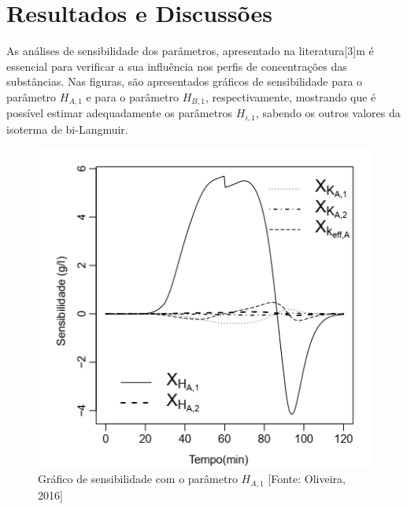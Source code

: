 \documentclass[por]{Template_SBEF}
\begin{document}
\section{Resultados e Discussões}
As análises de sensibilidade dos parâmetros, apresentado na literatura[3]m é essencial para verificar a sua influência nos perfis de concentrações das substâncias. Nas figuras, são apresentados gráficos de sensibilidade para o parâmetro $H_{A,1}$ e para o parâmetro $H_{B,1}$, respectivamente, mostrando que é possível estimar adequadamente os parâmetros $H_{i,1}$, sabendo os outros valores da isoterma de bi-Langmuir.




\begin{figure}[!tb] 
	\centering
	\includegraphics[width=.8\columnwidth]{Arquivos/figura4.png} 
	\caption{Gráfico de sensibilidade com o parâmetro $H_{A,1}$ [Fonte: Oliveira, 2016]} 
\end{figure}
\end{document}
